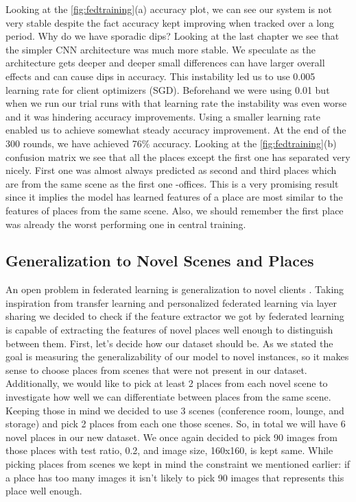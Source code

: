 \documentclass[11pt]{article}
\begin{document}
\par Looking at the \ref{fig:fedtraining}{(a)} accuracy plot, we can see our system is not very stable despite the fact accuracy kept improving when tracked over a long period. Why do we have sporadic dips? Looking at the last chapter we see that the simpler CNN architecture was much more stable. We speculate as the architecture gets deeper and deeper small differences can have larger overall effects and can cause dips in accuracy. This instability led us to use 0.005 learning rate for client optimizers (SGD). Beforehand we were using 0.01 but when we run our trial runs with that learning rate the instability was even worse and it was hindering accuracy improvements. Using a smaller learning rate enabled us to achieve somewhat steady accuracy improvement. At the end of the 300 rounds, we have achieved 76\% accuracy. Looking at the \ref{fig:fedtraining}{(b)} confusion matrix we see that all the places except the first one has separated very nicely. First one was almost always predicted as second and third places which are from the same scene as the first one -offices. This is a very promising result since it implies the model has learned features of a place are most similar to the features of places from the same scene. Also, we should remember the first place was already the worst performing one in central training.

\subsection{Generalization to Novel Scenes and Places}

\par An open problem in federated learning is generalization to novel clients \cite{advancesAndOpenProblems}. Taking inspiration from transfer learning and personalized federated learning via layer sharing \cite{layerSharing} we decided to check if the feature extractor we got by federated learning is capable of extracting the features of novel places well enough to distinguish between them. First, let’s decide how our dataset should be. As we stated the goal is measuring the generalizability of our model to novel instances, so it makes sense to choose places from scenes that were not present in our dataset. Additionally, we would like to pick at least 2 places from each novel scene to investigate how well we can differentiate between places from the same scene. Keeping those in mind we decided to use 3 scenes (conference room, lounge, and storage) and pick 2 places from each one those scenes. So, in total we will have 6 novel places in our new dataset. We once again decided to pick 90 images from those places with test ratio, 0.2, and image size, 160x160, is kept same. While picking places from scenes we kept in mind the constraint we mentioned earlier: if a place has too many images it isn’t likely to pick 90 images that represents this place well enough.
\end{document}
